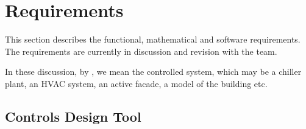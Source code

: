 \documentclass[letterpaper,10pt, openany,english]{sphinxmanual}
\begin{document}
\chapter{Requirements}
\label{\detokenize{requirements:requirements}}\label{\detokenize{requirements:sec-requirements}}\label{\detokenize{requirements::doc}}
This section describes the functional, mathematical and software requirements.
The requirements are currently in discussion and revision with the team.

In these discussion, by {\hyperref[\detokenize{glossary:term-plant}]{}}, we mean the controlled system, which may be a chiller plant,
an HVAC system, an active facade, a model of the building etc.


\section{Controls Design Tool}
\end{document}
